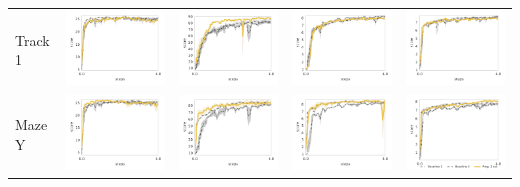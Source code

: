 \begin{table}
\begin{tabular}{m{} >{\centering}m{} >{\centering}m{} >{\centering}m{} >{\centering\arraybackslash}m{} }
	Track 1 &
        \includegraphics[width=.22\textwidth]{figures/app_plots/lab/st1/seek_track_01} &
        \includegraphics[width=.22\textwidth]{figures/app_plots/lab/st1/seek_track_02} &
        \includegraphics[width=.22\textwidth]{figures/app_plots/lab/st1/seek_track_03} &
        \includegraphics[width=.22\textwidth]{figures/app_plots/lab/st1/seek_track_04} \\

	Maze Y &
        \includegraphics[width=.22\textwidth]{figures/app_plots/lab/smy1/seek_track_01} &
        \includegraphics[width=.22\textwidth]{figures/app_plots/lab/smy1/seek_track_02} &
        \includegraphics[width=.22\textwidth]{figures/app_plots/lab/smy1/seek_track_03} &
        \includegraphics[width=.22\textwidth]{figures/app_plots/lab_legend/smy1/seek_track_04} \\
    \end{tabular}
\end{table}


